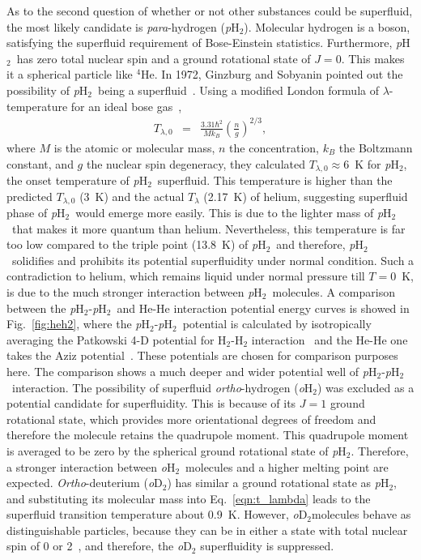 \documentclass[12pt]{iopart}
\newcommand{\hydrogen}{H$_2$}
\newcommand{\phtwo}{{\em p}H$_2$}
\begin{document}
As to the second question of whether or not other substances could be superfluid, the most likely candidate is {\em para}-hydrogen (\phtwo). Molecular hydrogen is a boson, satisfying the superfluid requirement of Bose-Einstein statistics. Furthermore, \phtwo~has zero total nuclear spin and a ground rotational state of $J=0$. This makes it a spherical particle like $^4$He. In 1972, Ginzburg and Sobyanin pointed out the possibility of \phtwo~being a superfluid~\cite{ginzburg_pH2_superfluid}. Using a modified London formula of $\lambda$-temperature for an ideal bose gas~\cite{modified_london_form},
\begin{eqnarray}
T_{\lambda,0}&=&\frac{3.31\hbar^2}{Mk_B}\left(\frac{n}{g}\right)^{2/3}, \label{eqn:t_lambda}
\end{eqnarray}
where $M$ is the atomic or molecular mass, $n$ the concentration, $k_B$ the Boltzmann constant, and $g$ the nuclear spin degeneracy, they calculated $T_{\lambda,0}\approx 6$~K for \phtwo, the onset temperature of \phtwo~superfluid. This temperature is higher than the predicted $T_{\lambda,0}$ (3~K) and the actual $T_{\lambda}$ (2.17~K) of helium, suggesting superfluid phase of \phtwo~would emerge more easily. 
This is due to the lighter mass of \phtwo~that makes it more quantum than helium. Nevertheless, this temperature is far too low compared to the triple point (13.8~K) of \phtwo~and therefore, \phtwo~solidifies and prohibits its potential superfluidity under normal condition. Such a contradiction to helium, which remains liquid under normal pressure till $T=0$~K, is due to the much stronger interaction between \phtwo~molecules. 
A comparison between the \phtwo-\phtwo~and He-He interaction potential energy curves is showed in Fig.~\ref{fig:heh2}, where the \phtwo-\phtwo~potential is calculated by isotropically averaging the Patkowski 4-D potential for H$_2$-H$_2$ interaction~\cite{patkowski_h2_pot} and the He-He one takes the Aziz potential~\cite{aziz_he_pot}. 
These potentials are chosen for comparison purposes here.
The comparison shows a much deeper and wider potential well of \phtwo-\phtwo~interaction. The possibility of superfluid {\em ortho}-hydrogen ({\em o}\hydrogen) was excluded as a potential candidate for superfluidity. This is because of its $J=1$ ground rotational state, which provides more orientational degrees of freedom and therefore the molecule retains the quadrupole moment. This quadrupole moment is averaged to be zero by the spherical ground rotational state of \phtwo. Therefore, a  stronger interaction between {\em o}\hydrogen~molecules and a higher melting point are expected. {\em Ortho}-deuterium ({\em o}D$_2$) has similar a ground rotational state as \phtwo,
and substituting its molecular mass into Eq.~\ref{eqn:t_lambda} leads to the superfluid transition temperature about 0.9~K.
However, {\em o}D$_2$molecules behave as distinguishable particles, because they can be in either a state with total nuclear spin of 0 or 2~\cite{grebenev_pH2_5ring}, and therefore, the {\em o}D$_2$ superfluidity is suppressed.
\end{document}
